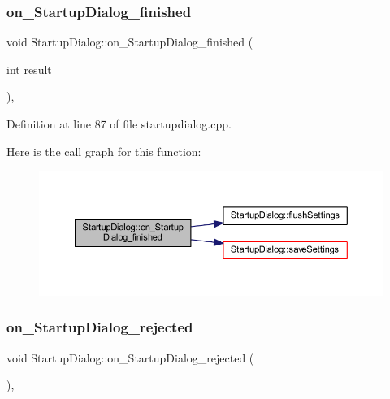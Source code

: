 \subsubsection{\texorpdfstring{on\_StartupDialog\_finished}{on\_StartupDialog\_finished}}
{\footnotesize\ttfamily void Startup\+Dialog\+::on\+\_\+\+Startup\+Dialog\+\_\+finished (\begin{DoxyParamCaption}\item[{int}]{result }\end{DoxyParamCaption})\hspace{0.3cm}{\ttfamily [private]}, {\ttfamily [slot]}}



Definition at line 87 of file startupdialog.\+cpp.

Here is the call graph for this function\+:
\nopagebreak
\begin{figure}[H]
\begin{center}
\leavevmode
\includegraphics[width=350pt]{classStartupDialog_a5d6aa20d81bc223b2e9931811b2aca95_cgraph}
\end{center}
\end{figure}
\mbox{\label{classStartupDialog_a49bcc6d2a28e82654ab583aba08f0ba5}} 
\subsubsection{\texorpdfstring{on\_StartupDialog\_rejected}{on\_StartupDialog\_rejected}}
{\footnotesize\ttfamily void Startup\+Dialog\+::on\+\_\+\+Startup\+Dialog\+\_\+rejected (\begin{DoxyParamCaption}{ }\end{DoxyParamCaption})\hspace{0.3cm}{\ttfamily [private]}, {\ttfamily [slot]}}



